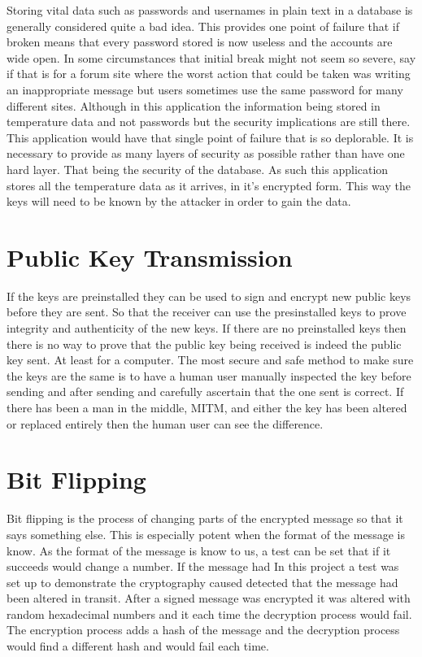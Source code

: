 Storing vital data such as passwords and usernames in plain text in a database is generally considered quite a bad idea. This provides one point of failure that if broken means that every password stored is now useless and the accounts are wide open. In some circumstances that initial break might not seem so severe, say if that is for a forum site where the worst action that could be taken was writing an inappropriate message but users sometimes use the same password for many different sites. Although in this application the information being stored in temperature data and not passwords but the security implications are still there. This application would have that single point of failure that is so deplorable. It is necessary to provide as many layers of security as possible rather than have one hard layer. That being the security of the database. As such this application stores all the temperature data as it arrives, in it's encrypted form. This way the keys will need to be known by the attacker in order to gain the data.

\section{Public Key Transmission}

If the keys are preinstalled they can be used to sign and encrypt new public keys before they are sent. So that the receiver can use the presinstalled keys to prove integrity and authenticity of the new keys. If there are no preinstalled keys then there is no way to prove that the public key being received is indeed the public key sent. At least for a computer. The most secure and safe method to make sure the keys are the same is to have a human user manually inspected the key before sending and after sending and carefully ascertain that the one sent is correct. If there has been a man in the middle, MITM, and either the key has been altered or replaced entirely then the human user can see the difference. 

\section{Bit Flipping}

Bit flipping is the process of changing parts of the encrypted message so that it says something else. This is especially potent when the format of the message is know. As the format of the message is know to us, a test can be set that if it succeeds would change a number. If the message had 
In this project a test was set up to demonstrate the cryptography caused detected that the message had been altered in transit. After a signed message was encrypted it was altered with random hexadecimal numbers and it each time the decryption process would fail. The encryption process adds a hash of the message and the decryption process would find a different hash and would fail each time.

